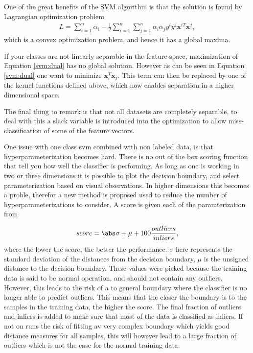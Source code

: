             
            One of the great benefits of the SVM algorithm is that the solution is found by Lagrangian optimization problem 
             \begin{align}
                L = \sum_{i=1}^n  \alpha_i - \frac{1}{2} \sum_{i=1}^n \sum_{j=1}^n \alpha_i \alpha_j y^i y^j \bm x^{iT} \bm x^j,
                \label{svm:dual}
            \end{align}
            which is a convex optimization problem, and hence it has a global maxima.
            
            
            If your classes are not linearly separable in the feature space, maximization of Equation \ref{svm:dual} has no global solution. However as can be seen in Equation \ref{svm:dual} one want to minimize $\bm x_i^T  \bm x_j$. This term can then be replaced by one of the kernel functions defined above, which now enables separation in a higher dimensional space.
            
            The final thing to remark is that not all datasets are completely separable, to deal with this a slack variable is introduced into the optimization to allow miss-classification of some of the feature vectors. 
        
    
        One issue with one class svm combined with non labeled data, is that hyperparameterization becomes hard. There is no out of the box scoring function that tell you how well the classifier is performing. As long as one is working in two or three dimensions it is possible to plot the decision boundary, and select parameterization based on visual observations. In higher dimensions this becomes a proble, therefor a new method is proposed used to reduce the number of hyperparameterizations to consider. A score is given each of the paramterization from
        
        \begin{align}
            score = \abs\sigma + \mu + 100\frac{outliers}{inliers},
        \end{align}
        where the lower the score, the better the performance. $\sigma$ here represents the standard deviation of the distances from the decision boundary, $\mu$ is the unsigned distance to the decision boundary. These values were picked because the training data is said to be normal operation, and should not contain any outliers. However, this leads to the risk of a to general boundary where the classifier is no longer able to predict outliers. This means that the closer the boundary is to the samples in the training data, the higher the score. The final fraction of outliers and inliers is added to make sure that most of the data is classified as inliers. If not on runs the risk of fitting av very complex boundary which yields good distance measures for all samples, this will however lead to a large fraction of outliers which is not the case for the normal training data. 
        
